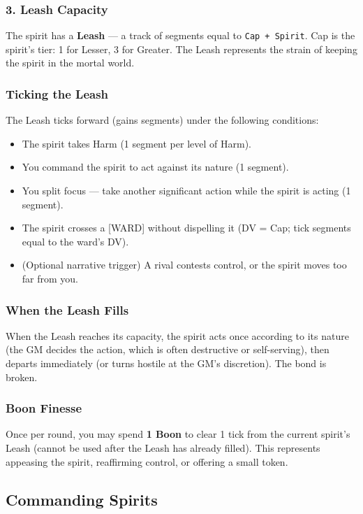 \subsubsection{3. Leash Capacity}
The spirit has a \textbf{Leash} — a track of segments equal to \texttt{Cap + Spirit}. Cap is the spirit's tier: 1 for Lesser, 3 for Greater. The Leash represents the strain of keeping the spirit in the mortal world.

\subsubsection{Ticking the Leash}
The Leash ticks forward (gains segments) under the following conditions:
\begin{itemize}
  \item The spirit takes Harm (1 segment per level of Harm).
  \item You command the spirit to act against its nature (1 segment).
  \item You split focus — take another significant action while the spirit is acting (1 segment).
  \item The spirit crosses a [WARD] without dispelling it (DV = Cap; tick segments equal to the ward's DV).
  \item (Optional narrative trigger) A rival contests control, or the spirit moves too far from you.
\end{itemize}

\subsubsection{When the Leash Fills}
When the Leash reaches its capacity, the spirit acts once according to its nature (the GM decides the action, which is often destructive or self-serving), then departs immediately (or turns hostile at the GM's discretion). The bond is broken.

\subsubsection{Boon Finesse}
Once per round, you may spend \textbf{1 Boon} to clear 1 tick from the current spirit's Leash (cannot be used after the Leash has already filled). This represents appeasing the spirit, reaffirming control, or offering a small token.

\subsection{Commanding Spirits}

